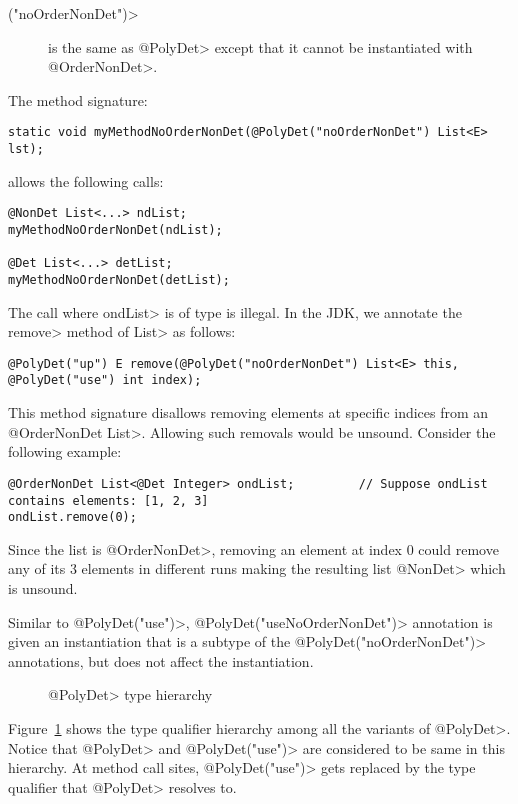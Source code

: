 \begin{description}
    \item[\<("noOrderNonDet")>] is the same as \<@PolyDet> except that it cannot be instantiated with \<@OrderNonDet>.
\end{description}
The method signature:
\begin{Verbatim}
static void myMethodNoOrderNonDet(@PolyDet("noOrderNonDet") List<E> lst);
\end{Verbatim}
allows the following calls:
\begin{Verbatim}
@NonDet List<...> ndList;
myMethodNoOrderNonDet(ndList);

@Det List<...> detList;
myMethodNoOrderNonDet(detList);
\end{Verbatim}
The call  where \<ondList>  is of type  is illegal.
In the JDK, we annotate the \<remove> method of \<List> as follows:
\begin{Verbatim}
@PolyDet("up") E remove(@PolyDet("noOrderNonDet") List<E> this, @PolyDet("use") int index);
\end{Verbatim}
This method signature disallows removing elements at specific indices from an  \<@OrderNonDet List>.
Allowing such removals would be unsound. Consider the following example:
\begin{Verbatim}
@OrderNonDet List<@Det Integer> ondList;         // Suppose ondList contains elements: [1, 2, 3]
ondList.remove(0);
\end{Verbatim}
Since the list is \<@OrderNonDet>, removing an element at index 0 could remove any of its 3 elements in different runs
making the resulting list \<@NonDet> which is unsound.

Similar to \<@PolyDet("use")>, \<@PolyDet("useNoOrderNonDet")>
annotation is given an instantiation that is a subtype of the
\<@PolyDet("noOrderNonDet")> annotations, but does not affect the instantiation.

\begin{figure}
    \begin{center}
    \end{center}
    \caption{\<@PolyDet> type hierarchy}
    \label{fig-determinism-poly-hierarchy}
\end{figure}
Figure~\ref{fig-determinism-poly-hierarchy} shows the type qualifier hierarchy among all the
variants of \<@PolyDet>. Notice that \<@PolyDet> and \<@PolyDet("use")> are considered
to be same in this hierarchy.
At method call sites, \<@PolyDet("use")> gets replaced by the type qualifier that \<@PolyDet>
resolves to.

